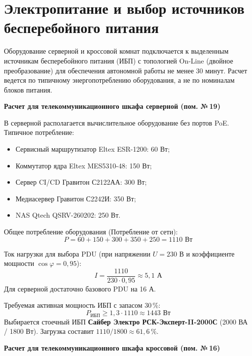 \documentclass{bmstu}
\begin{document}
\section{Электропитание и выбор источников бесперебойного питания}

Оборудование серверной и кроссовой комнат подключается к выделенным источникам бесперебойного питания (ИБП) с топологией On-Line (двойное преобразование) для обеспечения автономной работы не менее 30 минут. Расчет ведется по типичному энергопотреблению оборудования, а не по номиналам блоков питания.

\textbf{Расчет для телекоммуникационного шкафа серверной (пом. №\,19)}

В серверной располагается вычислительное оборудование без портов PoE. Типичное потребление:
\begin{itemize}
    \item Сервисный маршрутизатор Eltex ESR-1200: 60 Вт;
    \item Коммутатор ядра Eltex MES5310-48: 150 Вт;
    \item Сервер CI/CD Гравитон С2122АА: 300 Вт;
    \item Медиасервер Гравитон С2242И: 350 Вт;
    \item NAS Qtech QSRV-260202: 250 Вт.
\end{itemize}

Общее потребление оборудования (Потребление от сети):
\begin{equation}
    P = 60 + 150 + 300 + 350 + 250 = 1110 \text{ Вт}
\end{equation}

Ток нагрузки для выбора PDU (при напряжении $U = 230$ В и коэффициенте мощности $\cos \varphi = 0{,}95$):
\begin{equation}
    I = \frac{1110}{230 \cdot 0{,}95} \approx 5{,}1 \text{ А}
\end{equation}
Для серверной достаточно базового PDU на 16 А.

Требуемая активная мощность ИБП с запасом 30\,\%:
\begin{equation}
    P_{\text{ИБП}} \ge 1{,}3 \cdot 1110 \approx 1443 \text{ Вт}
\end{equation}
Выбирается стоечный ИБП \textbf{Сайбер Электро РСК-Эксперт-II-2000С} (2000 ВА / 1800 Вт). Загрузка составит $1110 / 1800 \approx 61{,}6\,\%$.

\textbf{Расчет для телекоммуникационного шкафа кроссовой (пом. №\,16)}
\end{document}
